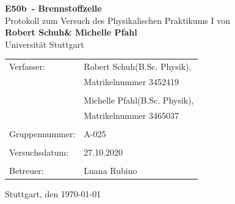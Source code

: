 \documentclass[a4paper,12pt,bibtotocnumbered]{scrartcl}
\numberwithin{equation}{section} %
\newcommand{\VERSUCHSDATUM}{27.10.2020}
\newcommand{\PROTOKOLLDATUM}{\today}
\newcommand{\VerfasserEINS}{Robert Schuh}
\newcommand{\MatNoEINS}{Matrikelnummer 3452419}
\newcommand{\StudiengangEINS}{B.Sc. Physik}
\newcommand{\VerfasserZWEI}{Michelle Pfahl}
\newcommand{\MatNoZWEI}{Matrikelnummer 3465037}
\newcommand{\StudiengangZWEI}{B.Sc. Physik}
\newcommand{\BETREUER}{Luana Rubino}
\newcommand{\GRUPPENNR}{A-025}
\newcommand{\VERSUCHSNR}{E50b}
\newcommand{\VERSUCHSNAME}{Brennstoffzelle}
\begin{document}
\thispagestyle{empty}


\begin{titlepage}

\begin{center}
\Huge{\textbf{\VERSUCHSNR\ - \VERSUCHSNAME}}\\%
\vspace{10mm}%
\Large{Protokoll zum Versuch des Physikalischen Praktikums I von \\ \textbf{\VerfasserEINS\;\& \VerfasserZWEI}}\\
\vspace{10mm} 
\Large{Universität Stuttgart}\\
\end{center}
\vspace{1cm}
\begin{center}
\begin{tabular}{ll}
\large{Verfasser:}		& \large{\VerfasserEINS\;(\StudiengangEINS),} \\ 
 						& \large{\MatNoEINS} \\
 						\vspace{0cm}\\
						& \large{\VerfasserZWEI\;(\StudiengangZWEI),} \\
						& \large{\MatNoZWEI} \\
						\vspace{0cm}\\
\large{Gruppennummer:}	& \large{\GRUPPENNR} \\
\vspace{0cm}\\
\large{Versuchsdatum:}	& \large{\VERSUCHSDATUM} \\
\vspace{0cm}\\
\large{Betreuer:}		& \large{\BETREUER}
\end{tabular}
\end{center}
\vspace{15mm}

\begin{center}
Stuttgart, den \PROTOKOLLDATUM
\end{center}

\end{titlepage}


\thispagestyle{empty}
\tableofcontents 
\clearpage %
\end{document}

